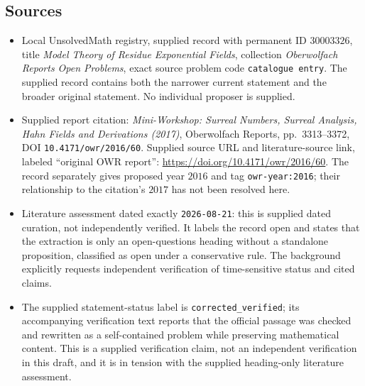 \documentclass[11pt]{article}
\begin{document}
\subsection{Sources}
\begin{itemize}
\item Local UnsolvedMath registry, supplied record with permanent ID \(30003326\), title \emph{Model Theory of Residue Exponential Fields}, collection \emph{Oberwolfach Reports Open Problems}, exact source problem code \texttt{catalogue entry}. The supplied record contains both the narrower current statement and the broader original statement. No individual proposer is supplied.
\item Supplied report citation: \emph{Mini-Workshop: Surreal Numbers, Surreal Analysis, Hahn Fields and Derivations (2017)}, Oberwolfach Reports, pp.\ 3313--3372, DOI \texttt{10.4171/owr/2016/60}. Supplied source URL and literature-source link, labeled ``original OWR report'': \url{https://doi.org/10.4171/owr/2016/60}. The record separately gives proposed year \(2016\) and tag \texttt{owr-year:2016}; their relationship to the citation's \(2017\) has not been resolved here.
\item Literature assessment dated exactly \texttt{2026-08-21}: this is supplied dated curation, not independently verified. It labels the record open and states that the extraction is only an open-questions heading without a standalone proposition, classified as open under a conservative rule. The background explicitly requests independent verification of time-sensitive status and cited claims.
\item The supplied statement-status label is \texttt{corrected\_verified}; its accompanying verification text reports that the official passage was checked and rewritten as a self-contained problem while preserving mathematical content. This is a supplied verification claim, not an independent verification in this draft, and it is in tension with the supplied heading-only literature assessment.
\end{itemize}
\end{document}

